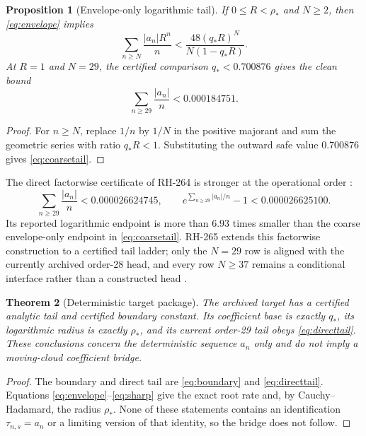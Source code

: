 \documentclass[11pt]{article}
\newtheorem{theorem}{Theorem}[section]
\newtheorem{proposition}[theorem]{Proposition}
\theoremstyle{definition}
\theoremstyle{remark}
\begin{document}
\begin{proposition}[Envelope-only logarithmic tail]\label{prop:envtail}
If $0\le R<\rho_*$ and $N\ge2$, then \eqref{eq:envelope} implies
\begin{equation}
 \sum_{n\ge N}\frac{|a_n|R^n}{n}
 <\frac{48(q_*R)^N}{N(1-q_*R)}.
 \label{eq:envtail}
\end{equation}
At $R=1$ and $N=29$, the certified comparison $q_*<0.700876$ gives the
clean bound
\begin{equation}
 \sum_{n\ge29}\frac{|a_n|}{n}<0.000184751.
 \label{eq:coarsetail}
\end{equation}
\end{proposition}

\begin{proof}
For $n\ge N$, replace $1/n$ by $1/N$ in the positive majorant and sum the
geometric series with ratio $q_*R<1$.  Substituting the outward safe value
$0.700876$ gives \eqref{eq:coarsetail}.
\end{proof}

The direct factorwise certificate of RH-264 is stronger at the operational
order \citep{WangRH264}:
\begin{equation}
 \sum_{n\ge29}\frac{|a_n|}{n}<0.000026624745,
 \qquad e^{\sum_{n\ge29}|a_n|/n}-1<0.000026625100.
 \label{eq:directtail}
\end{equation}
Its reported logarithmic endpoint is more than $6.93$ times smaller than the
coarse envelope-only endpoint in \eqref{eq:coarsetail}.  RH-265 extends this
factorwise construction to a certified tail ladder; only the $N=29$ row is
aligned with the currently archived order-28 head, and every row $N\ge37$
remains a conditional interface rather than a constructed head
\citep{WangRH265}.

\begin{theorem}[Deterministic target package]\label{thm:target}
The archived target has a certified analytic tail and certified boundary
constant.  Its coefficient base is exactly $q_*$, its logarithmic radius is
exactly $\rho_*$, and its current order-29 tail obeys \eqref{eq:directtail}.
These conclusions concern the deterministic sequence $a_n$ only and do not
imply a moving-cloud coefficient bridge.
\end{theorem}

\begin{proof}
The boundary and direct tail are \eqref{eq:boundary} and
\eqref{eq:directtail}.  Equations \eqref{eq:envelope}--\eqref{eq:sharp} give
the exact root rate and, by Cauchy--Hadamard, the radius $\rho_*$.  None of
these statements contains an identification $\tau_{n,s}=a_n$ or a limiting
version of that identity, so the bridge does not follow.
\end{proof}
\end{document}
